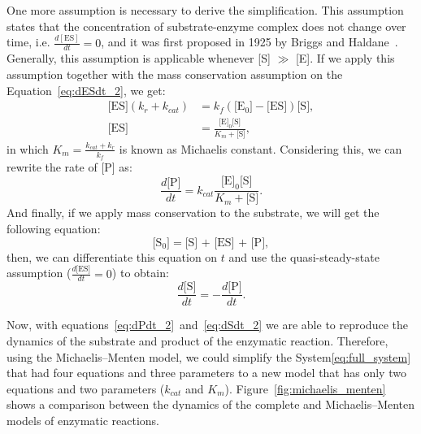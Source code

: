 One more assumption is necessary to derive the simplification. This 
assumption states that the concentration of substrate-enzyme complex
does not change over time, i.e. $\frac{d[\text{ES}]}{dt} = 0$, and it 
was first proposed in 1925 by Briggs and Haldane~\cite{Briggs1925}. 
Generally, this assumption is applicable whenever [S] $\gg$ [E]. 
If we apply this assumption together with the mass conservation 
assumption on the Equation~\ref{eq:dESdt_2}, we get:
\begin{equation*}  
    \begin{aligned}
        \text{[ES]} (k_r + k_{cat}) &= 
            k_f(\text{[E$_0$]} - \text{[ES]})\text{[S]}, \\
        \text{[ES]} &= \frac{\text{[E]}_0\text{[S]}}{K_m + \text{[S]}}, 
    \end{aligned}
\end{equation*}
in which $K_m = \frac{k_{cat} + k_r}{k_f}$ is known as Michaelis 
constant. Considering this, we can rewrite the rate of [P] as:
\begin{equation}
    \frac{d\text{[P]}}{dt} = k_{cat}\frac{\text{[E]}_0\text{[S]}}
        {K_m + \text{[S]}}.
    \label{eq:dPdt_2}
\end{equation}
And finally, if we apply mass conservation to the substrate, we will get
the following equation:
\begin{equation*}
    \text{[S$_0$]} = \text{[S] + [ES] + [P]},
\end{equation*}
then, we can differentiate this equation on $t$ and use the 
quasi-steady-state assumption ($\frac{d\text{[ES]}}{dt} = 0$) to obtain:
\begin{equation}
    \frac{d\text{[S]}}{dt} = - \frac{d\text{[P]}}{dt}.
    \label{eq:dSdt_2}
\end{equation}

Now, with equations~\ref{eq:dPdt_2}~and~\ref{eq:dSdt_2} we are able to
reproduce the dynamics of the substrate and product of the enzymatic 
reaction. Therefore, using the Michaelis--Menten model, we could simplify 
the System\ref{eq:full_system} that had four equations and three 
parameters to a new model that has only two equations and two parameters 
($k_{cat}$ and $K_m$). Figure~\ref{fig:michaelis_menten} shows a 
comparison between the dynamics of the complete and Michaelis--Menten 
models of enzymatic reactions.

